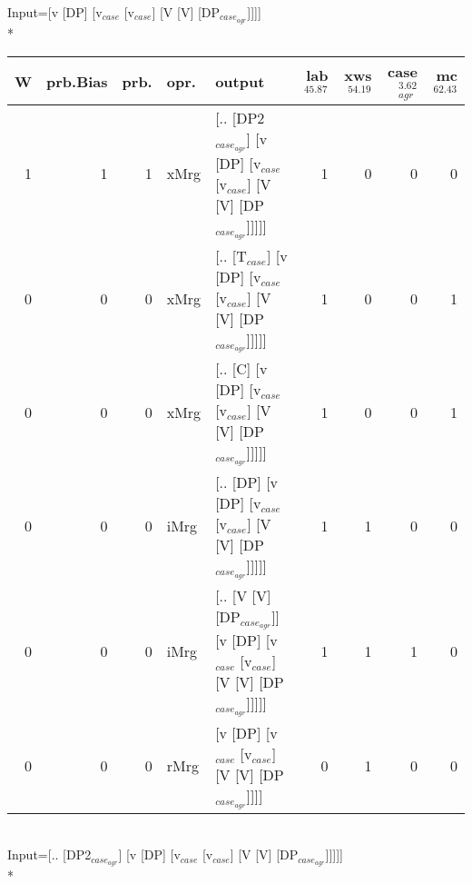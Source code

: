 \begingroup\scriptsize Input=[v [DP] [v$_{case}$ [v$_{case}$] [V [V] [DP$_{case_{agr}}$]]]]\\*
\begin{tabularx}{\linewidth}{rrrlXrrrr}
\hline
   W &   prb.Bias &   prb. & opr.   & output                                                                      &   lab$^{45.87}$ &   xws$^{54.19}$ &   case$_{agr}^{3.62}$ &   mc$^{62.43}$ \\
\hline
   1 &       1 &   1 & xMrg & [.. [DP2$_{case_{agr}}$] [v [DP] [v$_{case}$ [v$_{case}$] [V [V] [DP$_{case_{agr}}$]]]]]        &             1 &             0 &                  0 &            0 \\
   0 &       0 &   0 & xMrg & [.. [T$_{case}$] [v [DP] [v$_{case}$ [v$_{case}$] [V [V] [DP$_{case_{agr}}$]]]]]              &             1 &             0 &                  0 &            1 \\
   0 &       0 &   0 & xMrg & [.. [C] [v [DP] [v$_{case}$ [v$_{case}$] [V [V] [DP$_{case_{agr}}$]]]]]                   &             1 &             0 &                  0 &            1 \\
   0 &       0 &   0 & iMrg & [.. [DP] [v [DP] [v$_{case}$ [v$_{case}$] [V [V] [DP$_{case_{agr}}$]]]]]                  &             1 &             1 &                  0 &            0 \\
   0 &       0 &   0 & iMrg & [.. [V [V] [DP$_{case_{agr}}$]] [v [DP] [v$_{case}$ [v$_{case}$] [V [V] [DP$_{case_{agr}}$]]]]] &             1 &             1 &                  1 &            0 \\
   0 &       0 &   0 & rMrg & [v [DP] [v$_{case}$ [v$_{case}$] [V [V] [DP$_{case_{agr}}$]]]]                            &             0 &             1 &                  0 &            0 \\
\hline
\end{tabularx}\endgroup\\
\begingroup\scriptsize Input=[.. [DP2$_{case_{agr}}$] [v [DP] [v$_{case}$ [v$_{case}$] [V [V] [DP$_{case_{agr}}$]]]]]\\*
